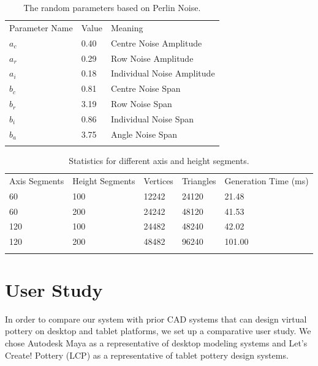 \documentclass{svjour3}                     %
\begin{document}
\begin{table}
\caption{The random parameters based on Perlin Noise.}
\label{tab:1}       %
\begin{tabular}{lll}
\hline\noalign{\smallskip}
Parameter Name & Value & Meaning  \\
\noalign{\smallskip}\hline\noalign{\smallskip}
$a_{c}$ & 0.40 & Centre Noise Amplitude \\
$a_{r}$ & 0.29 & Row Noise Amplitude \\
$a_{i}$ & 0.18 & Individual Noise Amplitude \\
$b_{c}$ & 0.81 & Centre Noise Span \\
$b_{r}$ & 3.19 & Row Noise Span \\
$b_{i}$ & 0.86 & Individual Noise Span \\
$b_{a}$ & 3.75 & Angle Noise Span \\
\noalign{\smallskip}\hline
\end{tabular}
\end{table}

\begin{table}
\caption{Statistics for different axis and height segments.}
\label{tab:2}       %
\begin{tabular}{lllll}
\hline\noalign{\smallskip}
Axis Segments & Height Segments & Vertices & Triangles & Generation Time (ms)\\
\noalign{\smallskip}\hline\noalign{\smallskip}
60 & 100 & 12242 & 24120 & 21.48 \\
60 & 200 & 24242 & 48120 & 41.53 \\
120 & 100 & 24482 & 48240 & 42.02 \\
120 & 200 & 48482 & 96240 & 101.00 \\
\noalign{\smallskip}\hline
\end{tabular}
\end{table}

\section{User Study}
\label{sec:6}
In order to compare our system with prior CAD systems that can design virtual pottery on desktop and tablet platforms, we set up a comparative user study. We chose Autodesk Maya \cite{website:maya} as a representative of desktop modeling systems and Let's Create! Pottery (LCP) \cite{website:letspottery} as a representative of tablet pottery design systems.
\end{document}
